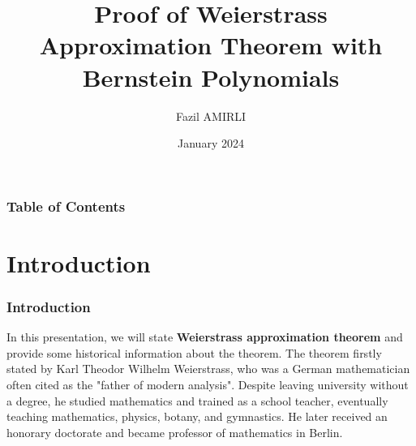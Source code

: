 \documentclass{beamer}
\title{Proof of Weierstrass Approximation Theorem with Bernstein Polynomials}
\author[Fazil Amirli]{Fazil AMIRLI}
\institute[Atilim University]{Atilim University, Department of Mathematics\\
\bigskip
{\color{red} Instructor: Prof. Dr. Mehmet TURAN }
}
\date{January 2024}
\begin{document}
\frame{\titlepage}
\begin{frame}
\frametitle{Table of Contents}
\tableofcontents[pausesections]
\end{frame}

\section{Introduction}
\begin{frame}
\frametitle{Introduction}

In this presentation, we will state \textbf{Weierstrass approximation theorem} and provide some historical information about the theorem. The theorem firstly stated by Karl Theodor Wilhelm Weierstrass, who was a German mathematician often cited as the "father of modern analysis"\cite{bell1986men}. Despite leaving university without a degree, he studied mathematics and trained as a school teacher, eventually teaching mathematics, physics, botany, and gymnastics. He later received an honorary doctorate and became professor of mathematics in Berlin.
\end{frame}
\end{document}
